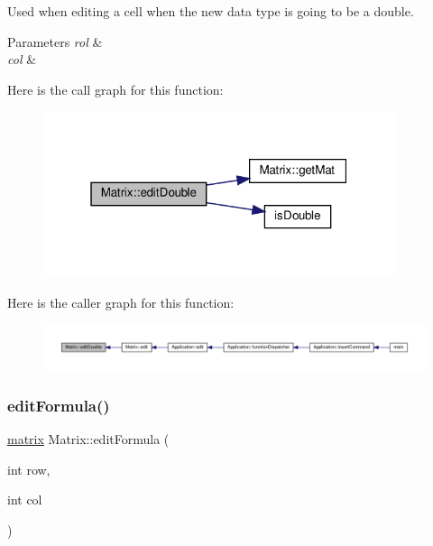 Used when editing a cell when the new data type is going to be a double. 
\begin{DoxyParams}{Parameters}
{\em rol} & \\
\hline
{\em col} & \\
\hline
\end{DoxyParams}
Here is the call graph for this function\+:
\nopagebreak
\begin{figure}[H]
\begin{center}
\leavevmode
\includegraphics[width=292pt]{class_matrix_a147d3813e96ef757fb0d5ff65e5f97ef_cgraph}
\end{center}
\end{figure}
Here is the caller graph for this function\+:
\nopagebreak
\begin{figure}[H]
\begin{center}
\leavevmode
\includegraphics[width=350pt]{class_matrix_a147d3813e96ef757fb0d5ff65e5f97ef_icgraph}
\end{center}
\end{figure}
\mbox{\label{class_matrix_af3d26e46fcec1a98380b1af04f008f22}} 
\subsubsection{\texorpdfstring{edit\+Formula()}{editFormula()}}
{\footnotesize\ttfamily \hyperlink{formula_8h_a869e2a5deeb3daa4c82d6bc91cf20d92}{matrix} Matrix\+::edit\+Formula (\begin{DoxyParamCaption}\item[{int}]{row,  }\item[{int}]{col }\end{DoxyParamCaption})\hspace{0.3cm}{\ttfamily [private]}}

